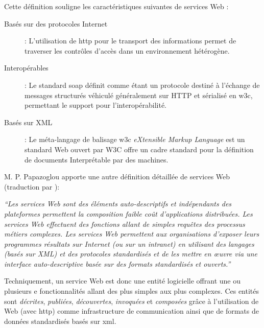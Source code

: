   Cette définition souligne les caractéristiques suivantes de services
  Web \cite{fremantle2002enterprise}:

  \renewcommand{\descriptionlabel}[1]{\hspace{0.5cm}\textbullet~\textsf{#1}}
  \begin{description}
  \item[Basés sur des protocoles Internet]: L'utilisation de
    \acrshort{http} pour le transport des informations permet de
    traverser les contrôles d'accès dans un environnement hétérogène.\\

  \item[Interopérables]: Le standard \acrshort{soap}
    \cite{box2000simple} définit comme étant un protocole destiné à
    l'échange de messages structurés véhiculé généralement sur
    \textsc{HTTP} et sérialisé en \acrshort{w3c}, permettant le
    support pour l'interopérabilité.

  \item[Basés sur XML] : Le méta-langage de balisage \acrshort{w3c}
    \textit{eXtensible Markup Language} est un standard Web ouvert par
    \textsc{W3C} \cite{bray1998extensible} offre un cadre standard
    pour la définition de documents Interprétable par des machines.
  \end{description}
  \enddescription

  M. P. Papazoglou \cite{papazoglou2003service} apporte une autre
  définition détaillée de services Web (traduction par
  \cite{driss2011approche}):

  \textit{``Les services Web sont des éléments auto-descriptifs et
    indépendants des plateformes permettent la composition faible coût
    d’applications distribuées. Les services Web effectuent des
    fonctions allant de simples requêtes des processus métiers
    complexes. Les services Web permettent aux organisations d'exposer
    leurs programmes résultats sur Internet (ou sur un intranet) en
    utilisant des langages (basés sur XML) et des protocoles
    standardisés et de les mettre en œuvre via une interface
    auto-descriptive basée sur des formats standardisés et ouverts.''}

  Techniquement, un service Web est donc une entité logicielle offrant
  une ou plusieurs e fonctionnalités allant des plus simples aux plus
  complexes. Ces entités sont \emph{décrites}, \emph{publiées},
  \emph{découvertes}, \emph{invoquées} et \emph{composées} grâce à
  l'utilisation de Web (avec \acrshort{http}) comme infrastructure de
  communication ainsi que de formats de données standardisés basés sur
  \acrshort{xml}.

